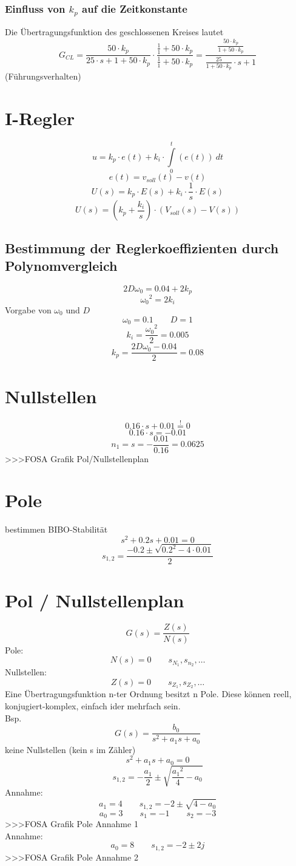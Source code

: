 \subsubsection{Einfluss von $k_p$ auf die Zeitkonstante}
Die Übertragungsfunktion des geschlossenen Kreises lautet
\[ G_{CL} = \frac{50 \cdot k_p}{25 \cdot s + 1 + 50 \cdot k_p} \cdot 
\frac{\frac{1}{1} + 50 \cdot k_p}{\frac{1}{1} + 50 \cdot k_p} 
= \frac{\frac{50 \cdot k_p}{1 + 50 \cdot k_p}}
{\frac{25}{1 + 50 \cdot k_p} \cdot s + 1} \]
(Führungsverhalten)

\section{I-Regler}
\[ u = k_p \cdot e(t) + k_i \cdot \int\limits_0^t (e(t)) ~ dt \]
\[ e(t) = v_{soll}(t) - v(t) \]
\[ U(s) = k_p \cdot E(s) + k_i \cdot \frac{1}{s} \cdot E(s) \]
\[ U(s) = \left( k_p + \frac{k_i}{s} \right) \cdot \left( V_{soll}(s) - V(s) \right) \]

\subsection{Bestimmung der Reglerkoeffizienten durch Polynomvergleich}
\[ 2 D \omega_0 = 0.04 + 2 k_p \]
\[ {\omega_0}^2 = 2 k_i \]
Vorgabe von $\omega_0$ und $D$
\[ \omega_0 = 0.1 \qquad D = 1 \]
\[ k_i = \frac{{\omega_0}^2}{2} = 0.005 \]
\[ k_p = \frac{2 D \omega_0 - 0.04}{2} = 0.08 \]

\section{Nullstellen}
\[ 0.16 \cdot s + 0.01 \stackrel{!}{=} 0 \]
\[ 0.16 \cdot s = -0.01 \]
\[ n_1 = s = -\frac{0.01}{0.16} = 0.0625 \]
>>>FOSA Grafik Pol/Nullstellenplan

\section{Pole}
bestimmen BIBO-Stabilität
\[ s^2 + 0.2 s + 0.01 = 0 \]
\[ s_{1,2} = \frac{-0.2 \pm \sqrt{0.2^2 - 4 \cdot 0.01}}{2} \]

\section{Pol / Nullstellenplan}
\[ G(s) = \frac{Z(s)}{N(s)} \]
Pole: 
\[ N(s) = 0 \qquad s_{N_1}, s_{n_2}, \ldots \]
Nullstellen: 
\[ Z(s) = 0 \qquad s_{Z_1}, s_{Z_2}, \ldots \]
Eine Übertragungsfunktion n-ter Ordnung besitzt n Pole. Diese können reell, 
konjugiert-komplex, einfach ider mehrfach sein. \\
Bsp. 
\[ G(s) = \frac{b_0}{s^2 + a_1 s + a_0} \]
keine Nullstellen (kein s im Zähler)\\
\[ s^2 + a_1 s + a_0 = 0 \]
\[ s_{1, 2} = -\frac{a_1}{2} \pm \sqrt{\frac{{a_1}^2}{4} - a_0} \]
Annahme: 
\[ a_1 = 4 \qquad s_{1, 2} = -2 \pm \sqrt{4 - a_0} \]
\[ a_0 = 3 \qquad s_1 = - 1 \qquad s_2 = -3 \]
>>>FOSA Grafik Pole Annahme 1\\
Annahme: 
\[ a_0 = 8 \qquad s_{1, 2} = -2 \pm 2 j \]
>>>FOSA Grafik Pole Annahme 2\\
